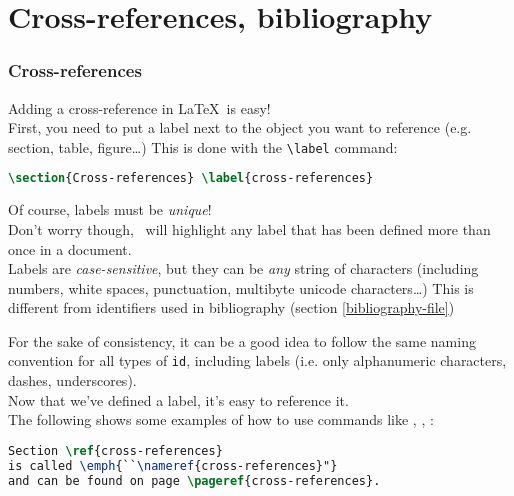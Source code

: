 
\part{Cross-references, bibliography}


\section{Cross-references} \label{cross-references}

Adding a cross-reference in \LaTeX\ is easy! \\

First, you need to put a label next to the object you want to reference (e.g. section, table, figure\ldots) This is done with the \lstinline|\label| command:

\begin{lstlisting}[language=tex]
\section{Cross-references} \label{cross-references}
\end{lstlisting}

\medskip

Of course, labels must be \emph{unique}! \\

Don't worry though, \TeXstudio\ will highlight any label that has been defined more than once in a document. \\

Labels are \emph{case-sensitive}, but they can be \emph{any} string of characters (including numbers, white spaces, punctuation, multibyte unicode characters\ldots) This is different from identifiers used in bibliography (section \ref{bibliography-file})

For the sake of consistency, it can be a good idea to follow the same naming convention for all types of \texttt{id}, including labels (i.e. only alphanumeric characters, dashes, underscores). \\

Now that we've defined a label, it's easy to reference it.\\

The following shows some examples of how to use commands like , ,  :
\begin{lstlisting}[language=tex]
Section \ref{cross-references} 
is called \emph{``\nameref{cross-references}"} 
and can be found on page \pageref{cross-references}.
\end{lstlisting}


